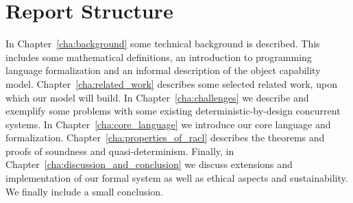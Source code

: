 \section{Report Structure}%
\label{sec:report_structure}

In Chapter~\ref{cha:background} some technical background is described. This
includes some mathematical definitions, an introduction to programming language
formalization and an informal description of the object capability
model. Chapter~\ref{cha:related_work} describes some selected related work, upon
which our model will build. In Chapter~\ref{cha:challenges} we describe and
exemplify some problems with some existing deterministic-by-design concurrent
systems. In Chapter~\ref{cha:core_language} we introduce our core language and
formalization. Chapter~\ref{cha:properties_of_racl} describes the theorems and
proofs of soundness and quasi-determinism. Finally, in
Chapter~\ref{cha:discussion_and_conclusion} we discuss extensions and
implementation of our formal system as well as ethical aspects and
sustainability. We finally include a small conclusion.



